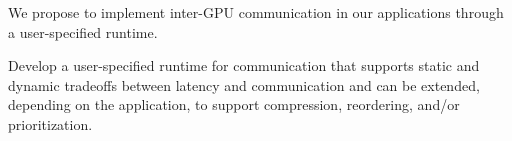 We propose to implement inter-GPU communication in our applications through a user-specified runtime.

\begin{rproblem}
Develop a user-specified runtime for communication that supports static and dynamic tradeoffs between latency and communication and can be extended, depending on the application, to support compression, reordering, and/or prioritization.
\end{rproblem}

